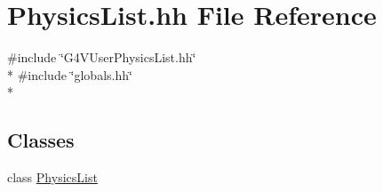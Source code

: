 \hypertarget{stuff_2_physics_list_8hh}{\section{Physics\-List.\-hh File Reference}
\label{stuff_2_physics_list_8hh}
}
{\ttfamily \#include \char`\"{}G4\-V\-User\-Physics\-List.\-hh\char`\"{}}\\*
{\ttfamily \#include \char`\"{}globals.\-hh\char`\"{}}\\*
\subsection*{Classes}
\begin{DoxyCompactItemize}
\item 
class \hyperlink{class_physics_list}{Physics\-List}
\end{DoxyCompactItemize}
